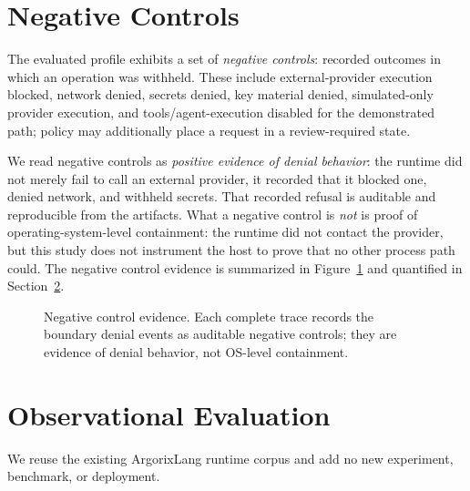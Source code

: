 \documentclass[conference]{IEEEtran}
\newcommand{\Argorix}{%
\textcolor{argViolet}{A}\textcolor{argViolet}{r}\textcolor{argIndigo}{g}\textcolor{argIndigo}{o}\textcolor{argElectric}{r}\textcolor{argElectric}{i}\textcolor{argElectric}{x}\textcolor{argCyan}{L}\textcolor{argCyan}{a}\textcolor{argCyanBright}{n}\textcolor{argCyanBright}{g}\xspace}
\begin{document}
\section{Negative Controls}\label{sec:negative}
The evaluated profile exhibits a set of \emph{negative controls}: recorded outcomes in
which an operation was withheld. These include external-provider execution blocked, network
denied, secrets denied, key material denied, simulated-only provider execution, and
tools/agent-execution disabled for the demonstrated path; policy may additionally place a
request in a review-required state.

We read negative controls as \emph{positive evidence of denial behavior}: the runtime did
not merely fail to call an external provider, it recorded that it blocked one, denied
network, and withheld secrets. That recorded refusal is auditable and reproducible from the
artifacts. What a negative control is \emph{not} is proof of operating-system-level
containment: the runtime did not contact the provider, but this study does not instrument
the host to prove that no other process path could. The negative control evidence is
summarized in Figure~\ref{fig:neg} and quantified in Section~\ref{sec:eval}.

\begin{figure}[t]
\centering
{}
\caption{Negative control evidence. Each complete trace records the boundary denial events
as auditable negative controls; they are evidence of denial behavior, not OS-level
containment.}
\label{fig:neg}
\end{figure}

\section{Observational Evaluation}\label{sec:eval}
We reuse the existing \Argorix runtime corpus \cite{venegas2026argorixlang} and add no new
experiment, benchmark, or deployment.
\end{document}
